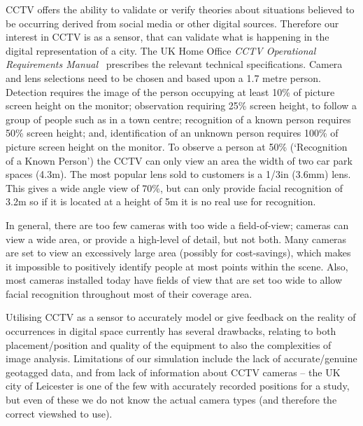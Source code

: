 \documentclass[conference]{IEEEtran}
\begin{document}
CCTV offers the ability to validate or verify theories about
situations believed to be occurring derived from social media or other
digital sources. Therefore our interest in CCTV is as a sensor, that
can validate what is happening in the digital representation of a
city. The UK Home Office {\emph{CCTV Operational Requirements
Manual}}~\cite{ukhocctv:2009} prescribes the relevant technical
specifications. Camera and lens selections need to be chosen and based
upon a 1.7 metre person. Detection requires the image of the person
occupying at least 10\% of picture screen height on the monitor;
observation requiring 25\% screen height, to follow a group of people
such as in a town centre; recognition of a known person requires 50\%
screen height; and, identification of an unknown person requires 100\%
of picture screen height on the monitor. To observe a person at 50\%
(`Recognition of a Known Person') the CCTV can only view an area the
width of two car park spaces (4.3m). The most popular lens sold to
customers is a 1/3in (3.6mm) lens. This gives a wide angle view of
70\%, but can only provide facial recognition of 3.2m so if it is
located at a height of 5m it is no real use for recognition.

In general, there are too few cameras with too wide a field-of-view;
cameras can view a wide area, or provide a high-level of detail, but
not both. Many cameras are set to view an excessively large area
(possibly for cost-savings), which makes it impossible to positively
identify people at most points within the scene. Also, most cameras
installed today have fields of view that are set too wide to allow
facial recognition throughout most of their coverage area.

Utilising CCTV as a sensor to accurately model or give feedback on the
reality of occurrences in digital space currently has several
drawbacks, relating to both placement/position and quality of the
equipment to also the complexities of image analysis. Limitations of
our simulation include the lack of accurate/genuine geotagged data,
and from lack of information about CCTV cameras -- the UK city of
Leicester is one of the few with accurately recorded positions for a
study, but even of these we do not know the actual camera types (and
therefore the correct viewshed to use).
\end{document}
